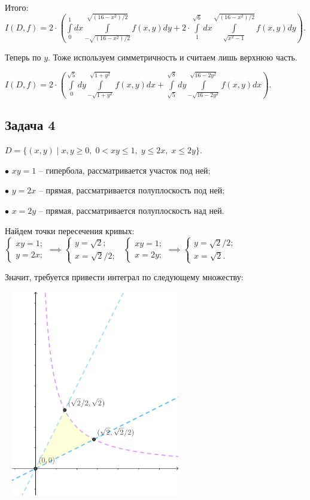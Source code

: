 \documentclass[a4paper, fleqn]{article}
\begin{document}
    
    
    Итого: $I(D, f) = 2 \cdot \left( \displaystyle \int\limits_0^{1} dx \int\limits_{-\sqrt{(16 - x^2)/2}}^{\sqrt{(16 - x^2)/2} } f(x,y) dy + 2 \cdot \displaystyle \int\limits_1^{\sqrt{6}} dx \int\limits_{\sqrt{x^2 - 1}}^{\sqrt{(16 - x^2)/2} } f(x, y) dy \right).$
    
    Теперь по $y$. Тоже используем симметричность и считаем лишь верхнюю часть.
    
     $I(D,f ) = 2 \cdot \left( \displaystyle \int\limits_0^{\sqrt{5}} dy \int\limits_{-\sqrt{1 + y^2}}^{\sqrt{1 + y^2} } f(x, y) dx + \displaystyle \int\limits_{\sqrt{5}}^{\sqrt{8}} dy \int\limits_{-\sqrt{16 - 2y^2}}^{\sqrt{16 - 2y^2} } f(x, y) dx \right).$
    
     \subsection*{Задача 4}
        
    $D = \{ (x,y ) \mid x, y \geq 0, \; 0< xy \leq 1, \; y \leq 2x, \; x \leq 2y\}.$
    
    $\bullet$ $xy = 1$ -- гипербола, рассматривается участок под ней;
    
    $\bullet$ $y = 2x$ -- прямая, рассматривается полуплоскость под ней;
    
    $\bullet$ $x = 2y$ -- прямая, рассматривается полуплоскость над ней.
    
    Найдем точки пересечения кривых: $\begin{cases} xy = 1;\\
    y = 2x; \end{cases} \implies\begin{cases} y = \sqrt{2}; \\  x = \sqrt{2}/2 ;\end{cases}\; \; \begin{cases}xy = 1;\\
    x = 2y;\end{cases}\implies\begin{cases}y = \sqrt{2}/2; \\  x = \sqrt{2} .\end{cases}$
    
    Значит, требуется привести интеграл по следующему множеству:
    
    \includegraphics[width=8cm, height=9cm]{task 4.png}
    
\end{document}
